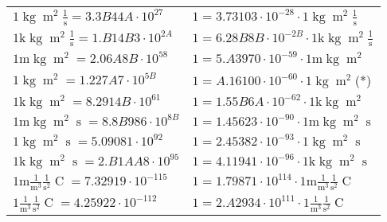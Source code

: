 \begin{center}
\begin{longtable}{l l}
{\color{black}$1 \bm{\mathrm{ }}\operatorname{kg}{\operatorname{m}^2}\frac1{\operatorname{s}}{}{} = 3.3B44A\cdot10^{27} $}   & {\color{black}$ 1 = 3.73103\cdot10^{-28} \cdot 1 \bm{\mathrm{ }}\operatorname{kg}{\operatorname{m}^2}\frac1{\operatorname{s}}{}{}$}  \\
{\color{gray}$1 \bm{\mathrm{ k}}\operatorname{kg}{\operatorname{m}^2}\frac1{\operatorname{s}}{}{} = 1.B14B3\cdot10^{2A} $}   & {\color{gray}$ 1 = 6.28B8B\cdot10^{-2B} \cdot 1 \bm{\mathrm{ k}}\operatorname{kg}{\operatorname{m}^2}\frac1{\operatorname{s}}{}{}$}  \\
{\color{gray}$1 \bm{\mathrm{ m}}\operatorname{kg}{\operatorname{m}^2}{}{}{} = 2.06A8B\cdot10^{58} $}   & {\color{gray}$ 1 = 5.A3970\cdot10^{-59} \cdot 1 \bm{\mathrm{ m}}\operatorname{kg}{\operatorname{m}^2}{}{}{}$}  \\
{\color{black}$1 \bm{\mathrm{ }}\operatorname{kg}{\operatorname{m}^2}{}{}{} = 1.227A7\cdot10^{5B} $}   & {\color{black}$ 1 = A.16100\cdot10^{-60} \cdot 1 \bm{\mathrm{ }}\operatorname{kg}{\operatorname{m}^2}{}{}{}$}\quad(*)\\
{\color{gray}$1 \bm{\mathrm{ k}}\operatorname{kg}{\operatorname{m}^2}{}{}{} = 8.2914B\cdot10^{61} $}   & {\color{gray}$ 1 = 1.55B6A\cdot10^{-62} \cdot 1 \bm{\mathrm{ k}}\operatorname{kg}{\operatorname{m}^2}{}{}{}$}  \\
{\color{gray}$1 \bm{\mathrm{ m}}\operatorname{kg}{\operatorname{m}^2}{\operatorname{s}}{}{} = 8.8B986\cdot10^{8B} $}   & {\color{gray}$ 1 = 1.45623\cdot10^{-90} \cdot 1 \bm{\mathrm{ m}}\operatorname{kg}{\operatorname{m}^2}{\operatorname{s}}{}{}$}  \\
{\color{black}$1 \bm{\mathrm{ }}\operatorname{kg}{\operatorname{m}^2}{\operatorname{s}}{}{} = 5.09081\cdot10^{92} $}   & {\color{black}$ 1 = 2.45382\cdot10^{-93} \cdot 1 \bm{\mathrm{ }}\operatorname{kg}{\operatorname{m}^2}{\operatorname{s}}{}{}$}  \\
{\color{gray}$1 \bm{\mathrm{ k}}\operatorname{kg}{\operatorname{m}^2}{\operatorname{s}}{}{} = 2.B1AA8\cdot10^{95} $}   & {\color{gray}$ 1 = 4.11941\cdot10^{-96} \cdot 1 \bm{\mathrm{ k}}\operatorname{kg}{\operatorname{m}^2}{\operatorname{s}}{}{}$}  \\
\hline{\color{gray}$1 \bm{\mathrm{ m}}\frac1{\operatorname{m}^3}\frac1{\operatorname{s}^2}{\operatorname{C}}{} = 7.32919\cdot10^{-115} $}   & {\color{gray}$ 1 = 1.79871\cdot10^{114} \cdot 1 \bm{\mathrm{ m}}\frac1{\operatorname{m}^3}\frac1{\operatorname{s}^2}{\operatorname{C}}{}$}  \\
{\color{black}$1 \bm{\mathrm{ }}\frac1{\operatorname{m}^3}\frac1{\operatorname{s}^2}{\operatorname{C}}{} = 4.25922\cdot10^{-112} $}   & {\color{black}$ 1 = 2.A2934\cdot10^{111} \cdot 1 \bm{\mathrm{ }}\frac1{\operatorname{m}^3}\frac1{\operatorname{s}^2}{\operatorname{C}}{}$}  \\

\end{longtable}
\end{center}

